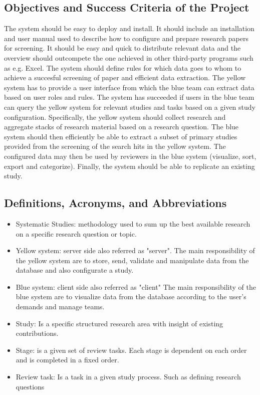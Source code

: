 \subsection{Objectives and Success Criteria of the Project}
The system should be easy to deploy and install. It should include an installation and user manual used to describe how to configure and prepare research papers for screening. It should be easy and quick to distribute relevant data and the overview should outcompete the one achieved in other third-party programs such as e.g. Excel. The system should define rules for which data goes to whom to achieve a succesful screening of paper and efficient data extraction. The yellow system has to provide a user interface from which the blue team can extract data based on user roles and rules. The system has succeeded if users in the blue team can query the yellow system for relevant studies and tasks based on a given study configuration. Specifically, the yellow system should collect research and aggregate stacks of research material based on a research question. The blue system should then efficiently be able to extract a subset of primary studies provided from the screening of the search hits in the yellow system. The configured data may then be used by reviewers in the blue system (visualize, sort, export and categorize). Finally, the system should be able to replicate an existing study.

\newpage

\subsection{Definitions, Acronyms, and Abbreviations}

	\begin{itemize}
	  \item Systematic Studies: methodology used to sum up the best available research on a specific research question or topic.  
	  \item Yellow system: server side also referred as "server". The main responsibility of the yellow system are to store, send, validate and manipulate data from the database and also configurate a study.
	  \item Blue system: client side also referred as "client" The main responsibility of the blue system are to visualize data from the database according to the user's demands and manage teams.
	  \item Study: Is a specific structured research area with insight of existing contributions.
	  \item Stage: is a given set of review tasks. Each stage is dependent on each order and is completed in a fixed order.
	  \item Review task: Is a task in a given study process. Such as defining research questions
	  
	\end{itemize}
	

